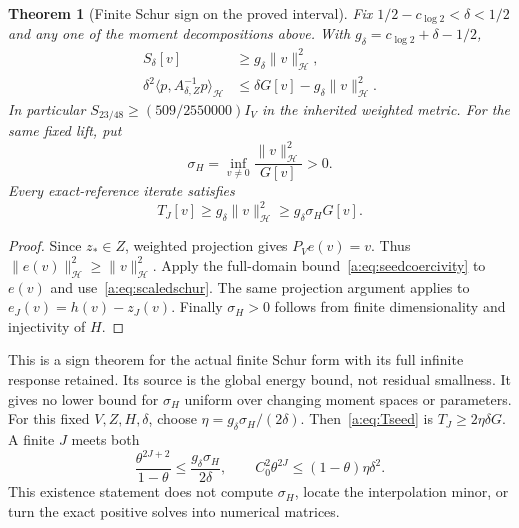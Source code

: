 \documentclass[11pt,a4paper]{article}
\numberwithin{equation}{section}
\newtheorem{theorem}{Theorem}[section]
\theoremstyle{definition}\newtheorem{definition}[theorem]{Definition}
\theoremstyle{remark}\newtheorem{remark}[theorem]{Remark}
\newcommand{\Hh}{\mathcal H}\newcommand{\Hw}{\mathcal H}
\newcommand{\ip}[2]{\langle#1,#2\rangle}\newcommand{\norm}[1]{\lVert#1\rVert}\newcommand{\abs}[1]{\lvert#1\rvert}
\begin{document}
\begin{theorem}[Finite Schur sign on the proved interval]\label{a:thm:finiteseed}
Fix $1/2-c_{\log2}<\delta<1/2$ and any one of the moment decompositions above. With $g_\delta=c_{\log2}+\delta-1/2$,
\begin{align}
 S_\delta[v]&\ge g_\delta\norm v_{\Hh}^2,\label{a:eq:Sseed}\\
 \delta^2\ip p{A_{\delta,Z}^{-1}p}_{\Hh}
 &\le\delta G[v]-g_\delta\norm v_{\Hh}^2.\label{a:eq:signedresponse}
\end{align}
In particular $S_{23/48}\ge(509/2550000)I_V$ in the inherited weighted metric. For the same fixed lift, put
\begin{equation}\label{a:eq:sigmaH}
 \sigma_H=\inf_{v\ne0}\frac{\norm v_{\Hh}^2}{G[v]}>0.
\end{equation}
Every exact-reference iterate satisfies
\begin{equation}\label{a:eq:Tseed}
 T_J[v]\ge g_\delta\norm v_{\Hh}^2\ge g_\delta\sigma_HG[v].
\end{equation}
\end{theorem}
\begin{proof}
Since $z_*\in Z$, weighted projection gives $P_Ve(v)=v$. Thus
$\norm{e(v)}_{\Hh}^2\ge\norm v_{\Hh}^2$. Apply the full-domain bound~\eqref{a:eq:seedcoercivity} to $e(v)$ and use~\eqref{a:eq:scaledschur}. The same projection argument applies to $e_J(v)=h(v)-z_J(v)$. Finally $\sigma_H>0$ follows from finite dimensionality and injectivity of $H$.
\end{proof}

This is a sign theorem for the actual finite Schur form with its full infinite response retained. Its source is the global energy bound, not residual smallness. It gives no lower bound for $\sigma_H$ uniform over changing moment spaces or parameters.
For this fixed $V,Z,H,\delta$, choose
$\eta=g_\delta\sigma_H/(2\delta)$. Then~\eqref{a:eq:Tseed} is
$T_J\ge2\eta\delta G$. A finite $J$ meets both
\begin{equation}\label{a:eq:seedbudgets}
 \frac{\theta^{2J+2}}{1-\theta}\le\frac{g_\delta\sigma_H}{2\delta},
 \qquad C_0^2\theta^{2J}\le(1-\theta)\eta\delta^2.
\end{equation}
This existence statement does not compute $\sigma_H$, locate the interpolation minor, or turn the exact positive solves into numerical matrices.
\end{document}
